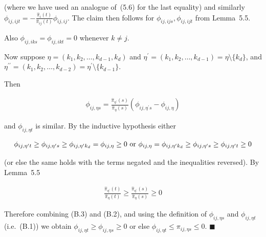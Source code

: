 \documentclass[10pt,a4paper]{article}
\begin{document}
(where we have used an analogue of (5.6) for the last equality) and similarly $\phi_{ij,ijt}=-\frac{\hat{\pi}_{i}(t)}{\hat{\pi}_{ij}(t)}\phi_{ij,ij}$. The claim then follows for $\phi_{ij,ijs},\phi_{ij,ijt}$ from Lemma 5.5.\par




Also $\phi_{ij,iks}=\phi_{ij,ikt}=0$ whenever $k\neq j$.\par




Now suppose $\eta=(k_{1},k_{2},\dots,k_{d-1},k_{d})$ and $\eta^{\prime}=(k_{1},k_{2},\dots,k_{d-1})=\eta\setminus\{k_{d}\}$, and $\eta^{\prime\prime}=(k_{1},k_{2},\dots,k_{d-2})=\eta^{\prime}\setminus\{k_{d-1}\}$.\par




Then\par


\[\begin{gathered}
\displaystyle\phi_{ij,\eta s}=\frac{\hat{\pi}_{\eta^{\prime}}(s)}{\hat{\pi}_{\eta}(s)}(\phi_{ij,\eta^{\prime}s}-\phi_{ij,\eta})
\end{gathered}\]


and $\phi_{ij,\eta t}$ is similar. By the inductive hypothesis either\par




\[\begin{gathered}
\displaystyle\phi_{ij,\eta^{\prime}t}\geq\phi_{ij,\eta^{\prime}s}\geq\phi_{ij,\eta^{\prime}k_{d}}=\phi_{ij,\eta}\geq 0\textnormal{ or }\phi_{ij,\eta}=\phi_{ij,\eta^{\prime}k_{d}}\geq\phi_{ij,\eta^{\prime}s}\geq\phi_{ij,\eta^{\prime}t}\geq 0
\end{gathered}\]


(or else the same holds with the terms negated and the inequalities reversed).
By Lemma 5.5\par


\[\begin{gathered}
\displaystyle\frac{\hat{\pi}_{\eta^{\prime}}(t)}{\hat{\pi}_{\eta}(t)}\geq\frac{\hat{\pi}_{\eta^{\prime}}(s)}{\hat{\pi}_{\eta}(s)}\geq 0
\end{gathered}\]




Therefore combining (B.3) and (B.2), and using the definition of $\phi_{ij,\eta s}$ and $\phi_{ij,\eta t}$ (i.e. (B.1)) we obtain $\phi_{ij,\eta t}\geq\phi_{ij,\eta s}\geq 0$ or else $\phi_{ij,\eta t}\leq\pi_{ij,\eta s}\leq 0$.
\ensuremath{\blacksquare}\par
\end{document}
